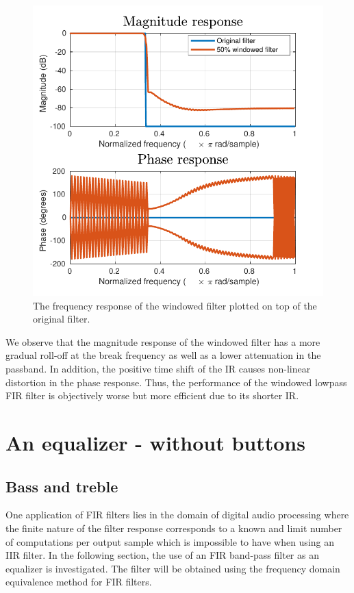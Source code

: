 \documentclass[journal]{IEEEtran}
\begin{document}
\begin{figure}[H]
    \centering
    \includegraphics[width=\columnwidth,clip]{assignment_02/plots/freq_resp_lowpass_fir_window.pdf}
    \caption{The frequency response of the windowed filter plotted on top of the original filter.}
    \label{fig:freq_resp_lowpass_window}
\end{figure}
We observe that the magnitude response of the windowed filter has a more gradual roll-off at the break frequency as well as a lower attenuation in the passband. In addition, the positive time shift of the IR causes non-linear distortion in the phase response. Thus, the performance of the windowed lowpass FIR filter is objectively worse but more efficient due to its shorter IR. 


\section{An equalizer - without buttons}
\subsection{Bass and treble}

One application of FIR filters lies in the domain of digital audio processing where the finite nature of the filter response corresponds to a known and limit number of computations per output sample which is impossible to have when using an IIR filter. In the following section, the use of an FIR band-pass filter as an equalizer is investigated. The filter will be obtained using the frequency domain equivalence method for FIR filters. 
\end{document}
